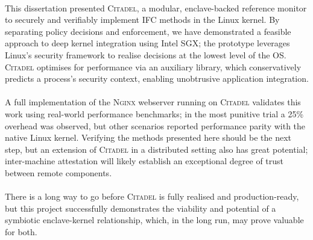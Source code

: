 \paragraph{} This dissertation presented \textsc{Citadel}, a modular, enclave-backed reference monitor to securely and verifiably implement IFC methods in the Linux kernel. By separating policy decisions and enforcement, we have demonstrated a feasible approach to deep kernel integration using Intel SGX; the prototype leverages Linux's security framework to realise decisions at the lowest level of the OS. \textsc{Citadel} optimises for performance via an auxiliary library, which conservatively predicts a process's security context, enabling unobtrusive application integration.

\paragraph{} A full implementation of the \textsc{Nginx} webserver running on \textsc{Citadel} validates this work using real-world performance benchmarks; in the most punitive trial a 25\% overhead was observed, but other scenarios reported performance parity with the native Linux kernel. Verifying the methods presented here should be the next step, but an extension of \textsc{Citadel} in a distributed setting also has great potential; inter-machine attestation will likely establish an exceptional degree of trust between remote components.


\paragraph{} There is a long way to go before \textsc{Citadel} is fully realised and production-ready, but this project successfully demonstrates the viability and potential of a symbiotic enclave-kernel relationship, which, in the long run, may prove valuable for both.